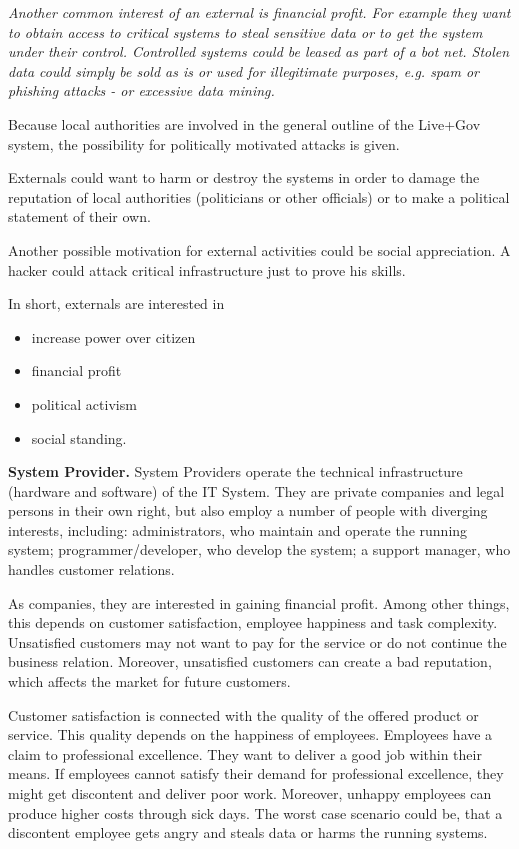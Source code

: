 \documentclass[runningheads,a4paper]{llncs}
\newenvironment{LGContent}
{ \par\color{blue} \it \small }
{ \par }
\begin{document}
\begin{LGContent}
Another common interest of an external is financial profit. For example they want to obtain access to critical systems to steal sensitive data or to get the system under their control.
Controlled systems could be leased as part of a bot net.
Stolen data could simply be sold as is or used for illegitimate purposes, e.g. spam or phishing attacks - or excessive data mining.

Because local authorities are involved in the general outline of the Live+Gov system, the possibility for politically motivated attacks is given.

Externals could want to harm or destroy the systems in order to damage the reputation of local authorities (politicians or other officials) or to make a political statement of their own.

Another possible motivation for external  activities could be social appreciation.
A hacker could attack critical infrastructure just to prove his skills.

In short, externals are interested in
\begin{itemize}
\item increase power over citizen
\item financial profit
\item political activism
\item social standing.
\end{itemize}

\textbf{System Provider.}
System Providers operate the technical infrastructure (hardware and software) of the IT System.
They are private companies and legal persons in their own right, but also employ a number of people with diverging interests, including:
administrators, who maintain and operate the running system;
programmer/developer, who develop the system;
a support manager, who handles customer relations.

As companies, they are interested in gaining financial profit.
Among other things, this depends on customer satisfaction, employee happiness and task complexity.
Unsatisfied customers may not want to pay for the service or do not continue the business relation.
Moreover, unsatisfied customers can create a bad reputation, which affects the market for future customers.

Customer satisfaction is connected with the quality of the offered product or service.
This quality depends on the happiness of employees.
Employees have a claim to professional excellence.
They want to deliver a good job within their means.
If employees cannot satisfy their demand for professional excellence, they might get discontent and deliver poor work.
Moreover, unhappy employees can produce higher costs through sick days.
The worst case scenario could be, that a discontent employee gets angry and steals data or harms the running systems.


\end{LGContent}
\end{document}
